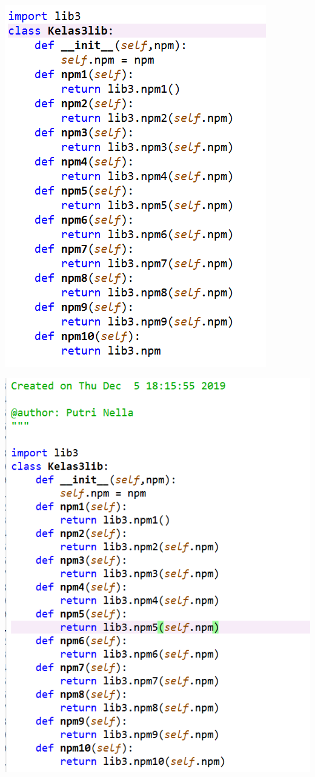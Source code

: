\documentclass[a4paper, 12pt]{article}
\begin{document}
\begin{center}
\includegraphics[width=.8\textwidth]{figure/main.PNG}
\end{center}
\item
\begin{center}
\includegraphics[width=.8\textwidth]{figure/12.PNG}
\end{center}
\end{document}
